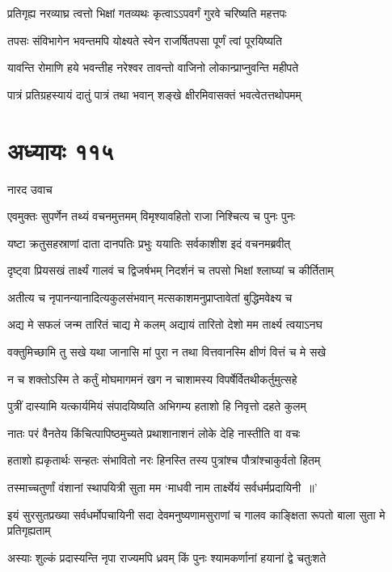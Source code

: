 \twolineshloka
{प्रतिगृह्य नरव्याघ्र त्वत्तो भिक्षां गतव्यथः}
{कृत्वाऽऽपवर्गं गुरवे चरिष्यति महत्तपः}


\twolineshloka
{तपसः संविभागेन भवन्तमपि योक्ष्यते}
{स्वेन राजर्षितपसा पूर्णं त्वां पूरयिष्यति}


\twolineshloka
{यावन्ति रोमाणि हये भवन्तीह नरेश्वर}
{तावन्तो वाजिनो लोकान्प्राप्नुवन्ति महीपते}


\twolineshloka
{पात्रं प्रतिग्रहस्यायं दातुं पात्रं तथा भवान्}
{शङ्खे क्षीरमिवासक्तं भवत्वेतत्तथोपमम्}


\chapter{अध्यायः ११५}
\twolineshloka
{नारद उवाच}
{}


\twolineshloka
{एवमुक्तः सुपर्णेन तथ्यं वचनमुत्तमम्}
{विमृश्यावहितो राजा निश्चित्य च पुनः पुनः}


\twolineshloka
{यष्टा क्रतुसहस्राणां दाता दानपतिः प्रभुः}
{ययातिः सर्वकाशीश इदं वचनमब्रवीत्}


\twolineshloka
{दृष्ट्वा प्रियसखं तार्क्ष्यं गालवं च द्विजर्षभम्}
{निदर्शनं च तपसो भिक्षां श्लाघ्यां च कीर्तिताम्}


\twolineshloka
{अतीत्य च नृपानन्यानादित्यकुलसंभवान्}
{मत्सकाशमनुप्राप्तावेतां बुद्धिमवेक्ष्य च}


\twolineshloka
{अद्य मे सफलं जन्म तारितं चाद्य मे कलम्}
{अद्यायं तारितो देशो मम तार्क्ष्य त्वयाऽनघ}


\twolineshloka
{वक्तुमिच्छामि तु सखे यथा जानासि मां पुरा}
{न तथा वित्तवानस्मि क्षीणं वित्तं च मे सखे}


\twolineshloka
{न च शक्तोऽस्मि ते कर्तुं मोघमागमनं खग}
{न चाशामस्य विपर्षेर्वितथीकर्तुमुत्सहे}


\twolineshloka
{पुत्रीं दास्यामि यत्कार्यमियं संपादयिष्यति}
{अभिगम्य हताशो हि निवृत्तो दहते कुलम्}


\twolineshloka
{नातः परं वैनतेय किंचित्पापिष्ठमुच्यते}
{प्रथाशानाशनं लोके देहि नास्तीति वा वचः}


\twolineshloka
{हताशो ह्यकृतार्थः सन्हतः संभावितो नरः}
{हिनस्ति तस्य पुत्रांश्च पौत्रांश्चाकुर्वतो हितम्}


\twolineshloka
{तस्माच्चतुर्णां वंशानां स्थापयित्री सुता मम}
{`माधवी नाम तार्क्ष्येयं सर्वधर्मप्रदायिनी ॥'}


\threelineshloka
{इयं सुरसुतप्रख्या सर्वधर्मोपचायिनी}
{सदा देवमनुष्यणामसुराणां च गालव}
{काङ्क्षिता रूपतो बाला सुता मे प्रतिगृह्यताम्}


\twolineshloka
{अस्याः शुल्कं प्रदास्यन्ति नृपा राज्यमपि ध्रवम्}
{किं पुनः श्यामकर्णानां हयानां द्वे चतुःशते}



